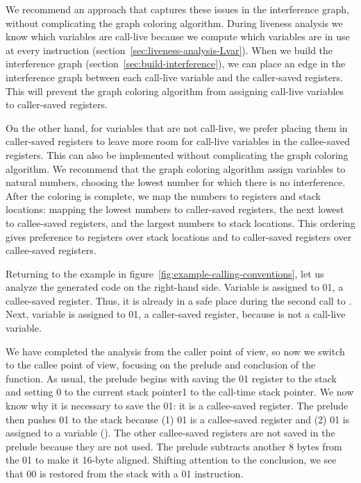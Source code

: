 \documentclass[7x10]{TimesAPriori_MIT}%
\def\xeightysixEd{0}
\def\riscvEd{1}
\def\architecture{1}
\newcommand\ifriscv[1]{\if\architecture\riscvEd{#1}\fi}
\newcommand\ifxeightsix[1]{\if\architecture\xeightysixEd{#1}\fi}
\numberwithin{theorem}{chapter}
\numberwithin{definition}{chapter}
\numberwithin{equation}{chapter}
\begin{document}
We recommend an approach that captures these issues in the
interference graph, without complicating the graph coloring algorithm.
During liveness analysis we know which variables are call-live because
we compute which variables are in use at every instruction
(section~\ref{sec:liveness-analysis-Lvar}). When we build the
interference graph (section~\ref{sec:build-interference}), we can
place an edge in the interference graph between each call-live
variable and the caller-saved registers. This will prevent the graph
coloring algorithm from assigning call-live variables to caller-saved
registers.

On the other hand, for variables that are not call-live, we prefer
placing them in caller-saved registers to leave more room for
call-live variables in the callee-saved registers. This can also be
implemented without complicating the graph coloring algorithm. We
recommend that the graph coloring algorithm assign variables to
natural numbers, choosing the lowest number for which there is no
interference. After the coloring is complete, we map the numbers to
registers and stack locations: mapping the lowest numbers to
caller-saved registers, the next lowest to callee-saved registers, and
the largest numbers to stack locations. This ordering gives preference
to registers over stack locations and to caller-saved registers over
callee-saved registers.

Returning to the example in
figure~\ref{fig:example-calling-conventions}, let us analyze the
generated {\ArchName} code on the right-hand side. Variable  is
assigned to \ifxeightsix{}\ifriscv{}, a callee-saved register. Thus, it is already
in a safe place during the second call to . Next,
variable  is assigned to \ifxeightsix{}\ifriscv{}, a caller-saved register,
because  is not a call-live variable.

We have completed the analysis from the caller point of view, so now
we switch to the callee point of view, focusing on the prelude and
conclusion of the  function. As usual, the prelude begins
with saving the \ifxeightsix{}\ifriscv{} register to the stack and setting 
\ifxeightsix{ to the current stack
  pointer}\ifriscv{ to the call-time stack pointer}. We now know why it is
necessary to save the \ifxeightsix{}\ifriscv{}: it
is a callee-saved register.
The prelude then pushes \ifxeightsix{}\ifriscv{} to
the stack because (1) \ifxeightsix{}\ifriscv{} is 
a callee-saved register and (2) \ifxeightsix{}\ifriscv{} is assigned to a variable
(). The other callee-saved registers are not saved in the
prelude because they are not used. The prelude subtracts another 8 bytes from
the \ifxeightsix{}\ifriscv{} to make it 16-byte aligned. Shifting attention to the
conclusion, we see that \ifxeightsix{}\ifxeightsix{} is restored from the stack with a
\ifxeightsix{}\ifriscv{} instruction.
\end{document}
